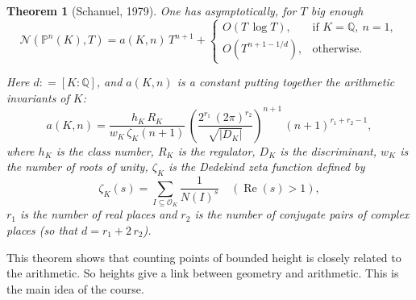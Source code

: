 \documentclass{article}
\newtheorem{theorem}[proposition]{Theorem}
\theoremstyle{definition}
\renewcommand{\Re}{\mathop{\mathrm{Re}}}
\newcommand{\dfn}{\mathrel{\mathop:}=}
\newcommand{\QQ}{\mathbb{Q}}
\newcommand{\PP}{\mathbb{P}}
\renewcommand{\O}{\mathcal{O}}
\begin{document}
\begin{theorem}[Schanuel, 1979]
  \label{theorem:schanuel}
  One has asymptotically, for $T$ big enough
  \[ \mathcal{N} (\PP^n (K), T) = a (K,n) \, T^{n+1} +
    \left\{\begin{array}{ll}
             O (T\,\log T), & \text{if }K=\QQ, ~ n = 1,\\
             O (T^{n+1 - 1/d}), & \text{otherwise}.
           \end{array}\right. \]

   Here $d \dfn [K:\QQ]$, and $a (K,n)$ is a constant putting together the
   arithmetic invariants of $K$:
   $$a (K,n) = \frac{h_K\,R_K}{w_K\,\zeta_K (n+1)} \, \left(\frac{2^{r_1}\,(2\pi)^{r_2}}{\sqrt{|D_K|}}\right)^{n+1}\,(n+1)^{r_1+r_2-1},$$
   where $h_K$ is the class number, $R_K$ is the regulator, $D_K$ is the
   discriminant, $w_K$ is the number of roots of unity, $\zeta_K$ is the
   Dedekind zeta function defined by
   $$\zeta_K (s) = \sum_{I\subseteq \O_K} \frac{1}{N (I)^s} \quad (\Re (s) > 1),$$
   $r_1$ is the number of real places and $r_2$ is the number of conjugate pairs
   of complex places (so that $d = r_1+2\,r_2$).
\end{theorem}

This theorem shows that counting points of bounded height is closely related to
the arithmetic. So heights give a link between geometry and arithmetic. This is
the main idea of the course.
\end{document}
